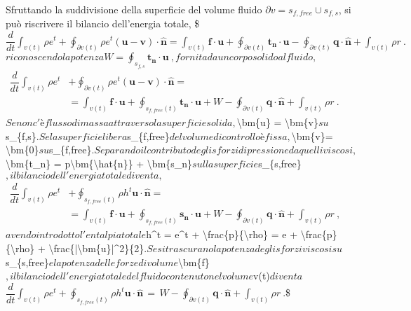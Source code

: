 \documentclass[letterpaper,10pt,italian]{jupyterBook}
\begin{document}
\sphinxAtStartPar
Sfruttando la suddivisione della superficie del volume fluido
\(\partial v = s_{f,free} \cup s_{f,s}\), si può riscrivere il bilancio
dell’energia totale,
\$\(\dfrac{d}{dt} \displaystyle\int_{v(t)} \rho e^t + \oint_{\partial v(t)} \rho e^t (\bm{u}-\bm{v}) \cdot \bm{\hat{n}}= \int_{v(t)} \bm{f} \cdot \bm{u} + \oint_{\partial v(t)} \bm{t_n} \cdot \bm{u} - \oint_{\partial v(t)} \bm{q} \cdot \bm{\hat{n}} + \int_{v(t)} \rho r \ .\)\(
riconoscendo la potenza
\)\(W = \oint_{s_{f,s}} \bm{t_n} \cdot \bm{u} \ ,\)\( fornita da un corpo
solido al fluido, \)\(\begin{aligned}
 \dfrac{d}{dt} \displaystyle\int_{v(t)} \rho e^t & + \oint_{\partial v(t)} \rho e^t (\bm{u}-\bm{v}) \cdot \bm{\hat{n}} = \\
  & = \int_{v(t)} \bm{f} \cdot \bm{u} + \oint_{s_{f,free}(t)} \bm{t_n} \cdot \bm{u} + W - \oint_{\partial v(t)} \bm{q} \cdot \bm{\hat{n}} + \int_{v(t)} \rho r \ .
\end{aligned}\)\( Se non c'è flusso di massa attraverso la superficie
solida, \)\textbackslash{}bm\{u\} = \textbackslash{}bm\{v\}\( su \)s\_\{f,s\}\(. Se la superficie libera
\)s\_\{f,free\}\( del volume di controllo è fissa, \)\textbackslash{}bm\{v\}= \textbackslash{}bm\{0\}\( su
\)s\_\{f,free\}\(. Separando il contributo degli sforzi di pressione da
quelli viscosi, \)\textbackslash{}bm\{t\_n\} = \sphinxhyphen{}p\textbackslash{}bm\{\textbackslash{}hat\{n\}\} + \textbackslash{}bm\{s\_n\}\( sulla superficie
\)s\_\{s,free\}\(, il bilancio dell'energia totale diventa, \)\(\begin{aligned}
 \dfrac{d}{dt} \displaystyle\int_{v(t)} \rho e^t & + \oint_{s_{f,free}(t)} \rho h^t \bm{u} \cdot \bm{\hat{n}} = \\
  & = \int_{v(t)} \bm{f} \cdot \bm{u} + \oint_{s_{f,free}(t)} \bm{s_n} \cdot \bm{u} + W - \oint_{\partial v(t)} \bm{q} \cdot \bm{\hat{n}} + \int_{v(t)} \rho r \ ,
\end{aligned}\)\( avendo introdotto l'entalpia totale
\)h\textasciicircum{}t = e\textasciicircum{}t + \textbackslash{}frac\{p\}\{\textbackslash{}rho\} = e + \textbackslash{}frac\{p\}\{\textbackslash{}rho\} + \textbackslash{}frac\{|\textbackslash{}bm\{u\}|\textasciicircum{}2\}\{2\}\(.
Se si trascurano la potenza degli sforzi viscosi su \)s\_\{s,free\}\( e la
potenza delle forze di volume \)\textbackslash{}bm\{f\}\(, il bilancio dell'energia totale
del fluido contenuto nel volume \)v(t)\( diventa
\)\(\dfrac{d}{dt} \displaystyle\int_{v(t)} \rho e^t + \oint_{s_{f,free}(t)} \rho h^t \bm{u} \cdot \bm{\hat{n}}
 \, = \,
  W - \oint_{\partial v(t)} \bm{q} \cdot \bm{\hat{n}} + \int_{v(t)} \rho r \ .\)\$
\end{document}
